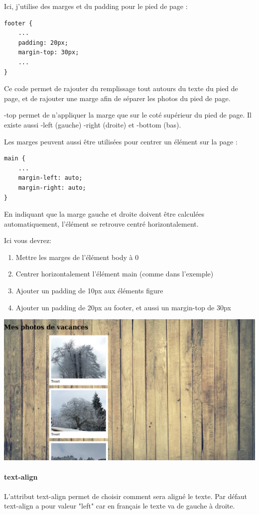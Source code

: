 Ici, j'utilise des marges et du padding pour le pied de page :
\begin{verbatim}
footer {
    ...
    padding: 20px;
    margin-top: 30px;
    ...
}
\end{verbatim}
Ce code permet de rajouter du remplissage tout autours du texte du pied de page,
et de rajouter une marge afin de séparer les photos du pied de page.

-top permet de n’appliquer la marge que sur le coté supérieur du pied de page.
Il existe aussi -left (gauche) -right (droite) et -bottom (bas).

Les marges peuvent aussi être utilisées pour centrer un élément sur la page :
\begin{verbatim}
main {
    ...
    margin-left: auto;
    margin-right: auto;
}
\end{verbatim}
En indiquant que la marge gauche et droite doivent être calculées
automatiquement, l'élément se retrouve centré horizontalement.

Ici vous devrez:
\begin{enumerate}
	\item Mettre les marges de l'élément body à 0
	\item Centrer horizontalement l'élément main (comme dans l'exemple)
	\item Ajouter un padding de 10px aux éléments figure
	\item Ajouter un padding de 20px au footer, et aussi un margin-top de
	30px
\end{enumerate}
\begin{center}\includegraphics[width=.8\linewidth]{img/screenshot_padding.png}\end{center}

\paragraph{text-align}
L'attribut text-align permet de choisir comment sera aligné le texte. Par défaut
text-align a pour valeur "left" car en français le texte va de gauche à droite.


